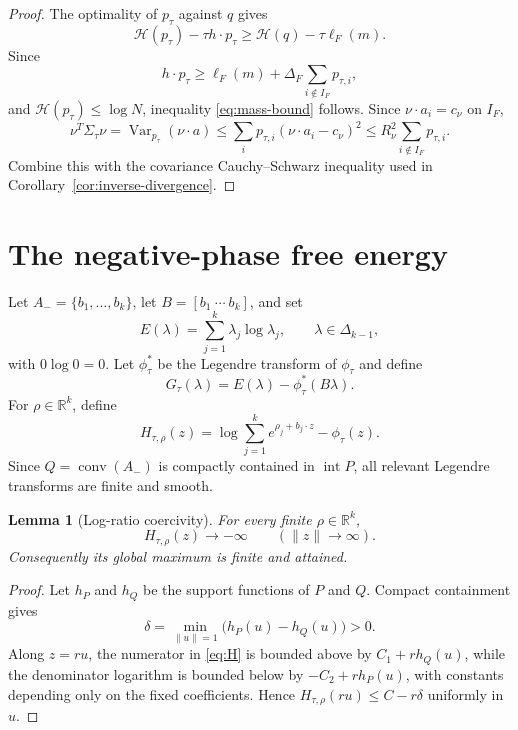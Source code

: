 \documentclass[11pt]{article}
\theoremstyle{plain}
\newtheorem{lemma}[theorem]{Lemma}
\theoremstyle{definition}
\theoremstyle{remark}
\newcommand{\R}{\mathbb R}
\newcommand{\conv}{\operatorname{conv}}
\newcommand{\DeltaK}{\Delta_{k-1}}
\begin{document}
\begin{proof}
The optimality of $p_\tau$ against $q$ gives
\[
 \mathcal H(p_\tau)-\tau h\cdot p_\tau
 \ge
 \mathcal H(q)-\tau\ell_F(m).
\]
Since
\[
 h\cdot p_\tau
 \ge
 \ell_F(m)+\Delta_F\sum_{i\notin I_F}p_{\tau,i},
\]
and $\mathcal H(p_\tau)\le\log N$, inequality \eqref{eq:mass-bound} follows. Since $\nu\cdot a_i=c_\nu$ on $I_F$,
\[
 \nu^T\Sigma_\tau\nu
 =\operatorname{Var}_{p_\tau}(\nu\cdot a)
 \le
 \sum_i p_{\tau,i}(\nu\cdot a_i-c_\nu)^2
 \le
 R_\nu^2\sum_{i\notin I_F}p_{\tau,i}.
\]
Combine this with the covariance Cauchy--Schwarz inequality used in Corollary~\ref{cor:inverse-divergence}.
\end{proof}

\section{The negative-phase free energy}

Let $A_-=\{b_1,\ldots,b_k\}$, let $B=[b_1\ \cdots\ b_k]$, and set
\[
 E(\lambda)=\sum_{j=1}^k\lambda_j\log\lambda_j,
 \qquad \lambda\in\DeltaK,
\]
with $0\log0=0$. Let $\phi_\tau^*$ be the Legendre transform of $\phi_\tau$ and define
\begin{equation}\label{eq:G}
 G_\tau(\lambda)=E(\lambda)-\phi_\tau^*(B\lambda).
\end{equation}
For $\rho\in\R^k$, define
\begin{equation}\label{eq:H}
 H_{\tau,\rho}(z)=
 \log\sum_{j=1}^k e^{\rho_j+b_j\cdot z}-\phi_\tau(z).
\end{equation}
Since $Q=\conv(A_-)$ is compactly contained in $\operatorname{int}P$, all relevant Legendre transforms are finite and smooth.

\begin{lemma}[Log-ratio coercivity]\label{lem:coercivity}
For every finite $\rho\in\R^k$,
\[
 H_{\tau,\rho}(z)\longrightarrow-\infty
 \qquad(\|z\|\to\infty).
\]
Consequently its global maximum is finite and attained.
\end{lemma}

\begin{proof}
Let $h_P$ and $h_Q$ be the support functions of $P$ and $Q$. Compact containment gives
\[
 \delta=\min_{\|u\|=1}\bigl(h_P(u)-h_Q(u)\bigr)>0.
\]
Along $z=ru$, the numerator in \eqref{eq:H} is bounded above by $C_1+r h_Q(u)$, while the denominator logarithm is bounded below by $-C_2+r h_P(u)$, with constants depending only on the fixed coefficients. Hence $H_{\tau,\rho}(ru)\le C-r\delta$ uniformly in $u$.
\end{proof}
\end{document}
